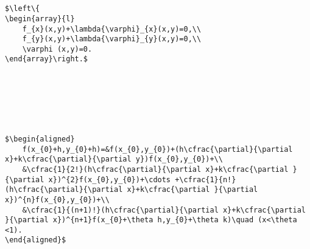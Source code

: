 ~\\


~\\

\noindent \setlength\sdim{10pt}

\clearpage

\begin{lstlisting}
$\left\{
\begin{array}{l}
	f_{x}(x,y)+\lambda{\varphi}_{x}(x,y)=0,\\
	f_{y}(x,y)+\lambda{\varphi}_{y}(x,y)=0,\\
	\varphi (x,y)=0.
\end{array}\right.$
\end{lstlisting}

~\\


~\\

\noindent \setlength\sdim{10pt}

~\\

\begin{lstlisting}
$\begin{aligned}
	f(x_{0}+h,y_{0}+h)=&f(x_{0},y_{0})+(h\cfrac{\partial}{\partial x}+k\cfrac{\partial}{\partial y})f(x_{0},y_{0})+\\
	&\cfrac{1}{2!}(h\cfrac{\partial}{\partial x}+k\cfrac{\partial }{\partial x})^{2}f(x_{0},y_{0})+\cdots +\cfrac{1}{n!}(h\cfrac{\partial}{\partial x}+k\cfrac{\partial }{\partial x})^{n}f(x_{0},y_{0})+\\
	&\cfrac{1}{(n+1)!}(h\cfrac{\partial}{\partial x}+k\cfrac{\partial }{\partial x})^{n+1}f(x_{0}+\theta h,y_{0}+\theta k)\quad (x<\theta <1).
\end{aligned}$
\end{lstlisting}


